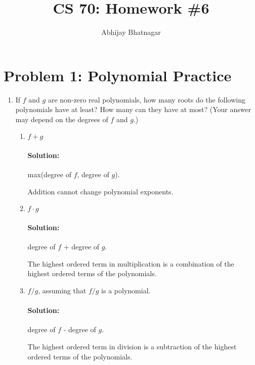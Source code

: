 \documentclass[11pt, notitlepage]{report}
\makeatletter
\newcommand{\Question}[1]{\newpage\section{#1}}
\newenvironment{solution}{\paragraph{Solution:}}{\hfill}
\newcommand*{\toccontents}{\@starttoc{toc}}
\makeatother
\begin{document}
   \title{CS 70: Homework \#6}
   \author{Abhijay Bhatnagar}
   \maketitle
   \toccontents



\setcounter{secnumdepth}{0} %

\Question{Problem 1: Polynomial Practice}
\begin{enumerate}[label=\alph*)]
	\item If $f$ and $g$ are non-zero real polynomials, how many roots do the following 
    polynomials have at least? How many can they have at most? 
    (Your answer may depend on the degrees of $f$ and $g$.)
	\begin{enumerate}[label=\roman*.)]
        \item $f + g$ 
        \begin{solution}
        	max(degree of $f$, degree of $g$). 
        	
        	Addition cannot change polynomial exponents.
        \end{solution}
        \item $f\cdot g$
        \begin{solution}
        	degree of $f$ + degree of $g$. 
        	
        	The highest ordered term in multiplication is a combination of the highest ordered terms of the polynomials.
        \end{solution}
        \item $f/g$, assuming that $f/g$ is a polynomial.        \begin{solution}
        	degree of $f$ - degree of $g$.  
        	
        	The highest ordered term in division is a subtraction of the highest ordered terms of the polynomials.

        \end{solution}
    \end{enumerate}


\end{enumerate}
\end{document}
